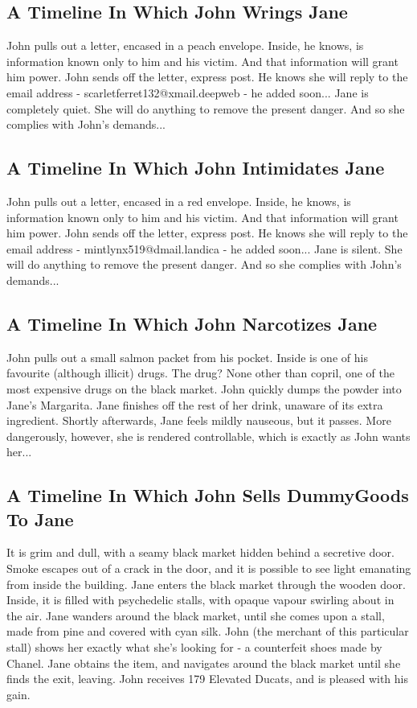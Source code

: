 \documentclass{article}
\begin{document}
\subsection{A Timeline In Which John Wrings Jane}


John pulls out a letter, encased in a peach envelope. Inside, he knows, is information known only to him and his victim. And that information will grant him power.
John sends off the letter, express post. He knows she will reply to the email address {-} scarletferret132@xmail.deepweb {-} he added soon...
Jane is completely quiet. She will do anything to remove the present danger. And so she complies with John's demands...
\subsection{A Timeline In Which John Intimidates Jane}


John pulls out a letter, encased in a red envelope. Inside, he knows, is information known only to him and his victim. And that information will grant him power.
John sends off the letter, express post. He knows she will reply to the email address {-} mintlynx519@dmail.landica {-} he added soon...
Jane is silent. She will do anything to remove the present danger. And so she complies with John's demands...
\subsection{A Timeline In Which John Narcotizes Jane}


John pulls out a small salmon packet from his pocket. Inside is one of his favourite (although illicit) drugs.
The drug? None other than copril, one of the most expensive drugs on the black market.
John quickly dumps the powder into Jane's Margarita.
Jane finishes off the rest of her drink, unaware of its extra ingredient.
Shortly afterwards, Jane feels mildly nauseous, but it passes.
More dangerously, however, she is rendered controllable, which is exactly as John wants her...
\subsection{A Timeline In Which John Sells DummyGoods To Jane}


It is grim and dull, with a seamy black market hidden behind a secretive door.
Smoke escapes out of a crack in the door, and it is possible to see light emanating from inside the building.
Jane enters the black market through the wooden door.
Inside, it is filled with psychedelic stalls, with opaque vapour swirling about in the air.
Jane wanders around the black market, until she comes upon a stall, made from pine and covered with cyan silk.
John (the merchant of this particular stall) shows her exactly what she's looking for {-} a counterfeit shoes made by Chanel.
Jane obtains the item, and navigates around the black market until she finds the exit, leaving.
John receives 179 Elevated Ducats, and is pleased with his gain.
\end{document}
